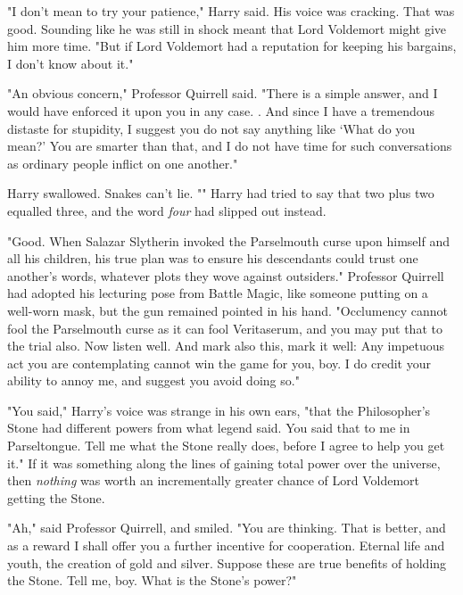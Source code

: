 "I don't mean to try your patience," Harry said. His voice was cracking. That
was good. Sounding like he was still in shock meant that Lord Voldemort might
give him more time. "But if Lord Voldemort had a reputation for keeping his
bargains, I don't know about it."

"An obvious concern," Professor Quirrell said. "There is a simple answer, and I
would have enforced it upon you in any case. . And
since I have a tremendous distaste for stupidity, I suggest you do not say
anything like `What do you mean?' You are smarter than that, and I do not have
time for such conversations as ordinary people inflict on one another."

Harry swallowed. Snakes can't lie. "" Harry
had tried to say that two plus two equalled three, and the word \emph{four} had
slipped out instead.

"Good. When Salazar Slytherin invoked the Parselmouth curse upon himself and
all his children, his true plan was to ensure his descendants could trust one
another's words, whatever plots they wove against outsiders." Professor
Quirrell had adopted his lecturing pose from Battle Magic, like someone putting
on a well-worn mask, but the gun remained pointed in his hand. "Occlumency
cannot fool the Parselmouth curse as it can fool Veritaserum, and you may put
that to the trial also. Now listen well.  And mark also this, mark it well:  Any impetuous act you are
contemplating cannot win the game for you, boy. I do credit your ability to
annoy me, and suggest you avoid doing so."

"You said," Harry's voice was strange in his own ears, "that the Philosopher's
Stone had different powers from what legend said. You said that to me in
Parseltongue. Tell me what the Stone really does, before I agree to help you
get it." If it was something along the lines of gaining total power over the
universe, then \emph{nothing} was worth an incrementally greater chance of Lord
Voldemort getting the Stone.

"Ah," said Professor Quirrell, and smiled. "You are thinking. That is better,
and as a reward I shall offer you a further incentive for cooperation. Eternal
life and youth, the creation of gold and silver. Suppose these are true
benefits of holding the Stone. Tell me, boy. What is the Stone's power?"

